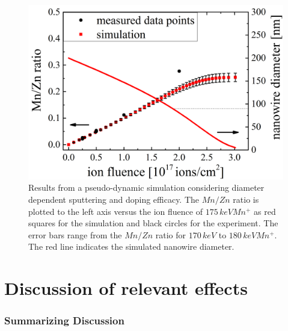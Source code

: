 \begin{figure}
	\centering
		\includegraphics[width=.5\textwidth]{images/pseudodynamic.png}
	\caption{Results from a pseudo-dynamic simulation considering diameter dependent sputtering and doping efficacy. The $Mn/Zn$ ratio is plotted to the left axis versus the ion fluence of $175\,keV Mn^+$ as red squares for the simulation and black circles for the experiment. The error bars range from the $Mn/Zn$ ratio for $170\,keV$ to $180\,keV Mn^+$. The red line indicates the simulated nanowire diameter.}
	\label{pseudodynamic}
\end{figure} 

\section{Discussion of relevant effects}

\subsubsection{Summarizing Discussion}